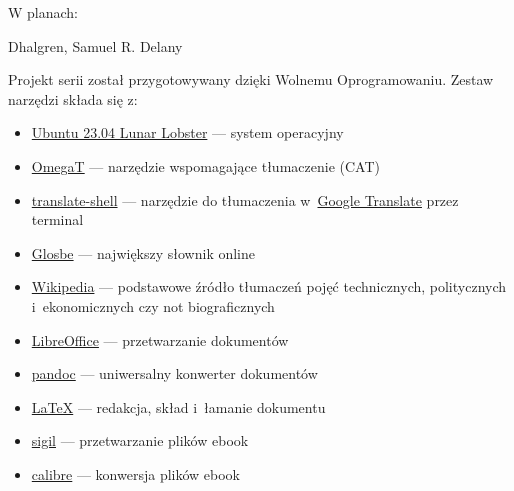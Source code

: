\documentclass[oneside,polish,11pt,rmheadings]{mwbk}
\begin{document}
\begin{center}

\begin{large}W planach:\end{large}\end{center}

\begin{center}
Dhalgren, Samuel R. Delany
\end{center}


\newpage

Projekt serii został przygotowywany dzięki Wolnemu Oprogramowaniu. Zestaw narzędzi składa się z:
\begin{itemize}
\item \href{https://ubuntu.com/}{Ubuntu 23.04 Lunar Lobster} --- system operacyjny
\item \href{https://omegat.org/}{OmegaT} --- narzędzie wspomagające tłumaczenie (CAT)
\item \href{https://github.com/soimort/translate-shell}{translate-shell} --- narzędzie do tłumaczenia w~\href{https://translate.google.pl}{Google Translate} przez terminal 
\item \href{https://glosbe.com/en/pl}{Glosbe} --- największy słownik online
\item \href{https://www.wikipedia.org/}{Wikipedia} --- podstawowe źródło tłumaczeń pojęć technicznych, politycznych i~ekonomicznych czy not biograficznych
\item \href{https://www.libreoffice.org/}{LibreOffice} --- przetwarzanie dokumentów 
\item \href{http://pandoc.org}{pandoc} --- uniwersalny konwerter dokumentów 
\item \href{https://www.latex-project.org/}{LaTeX} --- redakcja, skład i~łamanie dokumentu
\item \href{https://sigil-ebook.com/}{sigil} --- przetwarzanie plików ebook
\item \href{https://calibre-ebook.com/}{calibre} --- konwersja plików ebook
\end{itemize}
\end{document}
